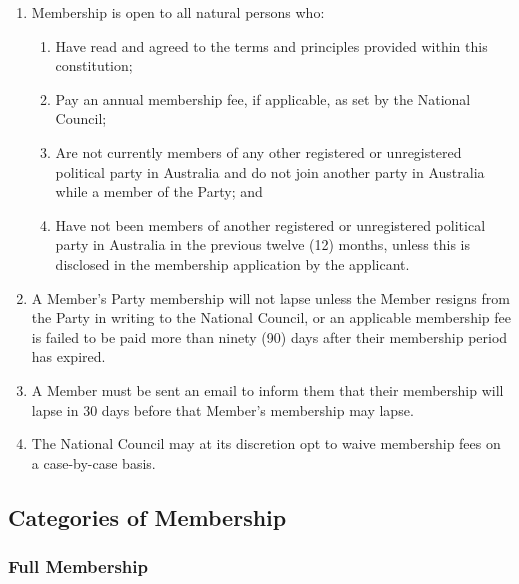 \documentclass[a4paper,titlepage,8.5pt]{article}
\begin{document}
\begin{enumerate}
\item Membership is open to all natural persons who:
\begin{enumerate}
\item Have read and agreed to the terms and principles provided within this constitution;
\item Pay an annual membership fee, if applicable, as set by the National Council;
\item Are not currently members of any other registered or unregistered political party in Australia and do not join another party in Australia while a member of the Party; and
\item Have not been members of another registered or unregistered political party in Australia in the previous twelve (12) months, unless this is disclosed in the membership application by the applicant.
\end{enumerate}
\item A Member's Party membership will not lapse unless the Member resigns from the Party in writing to the National Council, or an applicable membership fee is failed to be paid more than ninety (90) days after their membership period has expired.
\item A Member must be sent an email to inform them that their membership will lapse in 30 days before that Member's membership may lapse.
\item The National Council may at its discretion opt to waive membership fees on a case-by-case basis.
\end{enumerate}

\subsection{Categories of Membership}

\subsubsection{Full Membership}
\end{document}
